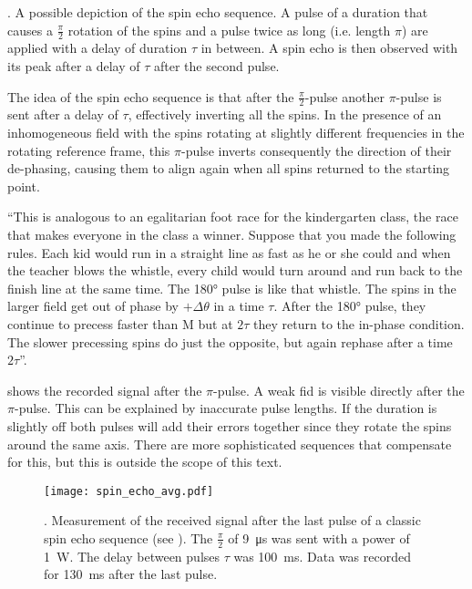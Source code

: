 \begin{marginfigure}
    \centering
    
    \caption{. A possible depiction of the spin echo sequence. A pulse of a duration that causes a \(\frac{\pi}{2}\) rotation of the spins and a pulse twice as long (i.e. length \(\pi\)) are applied with a delay of duration \(\tau\) in between. A spin echo is then observed with its peak after a delay of \(\tau\) after the second pulse.}
\end{marginfigure}

The idea of the spin echo sequence is that after the \(\frac{\pi}{2}\)-pulse another \(\pi\)-pulse is sent after a delay of \(\tau\), effectively inverting all the spins. In the presence of an inhomogeneous field with the spins rotating at slightly different frequencies in the rotating reference frame, this \(\pi\)-pulse inverts consequently the direction of their de-phasing, causing them to align again when all spins returned to the starting point.

\enquote{This is analogous to an egalitarian foot race for the kindergarten class, the race that makes everyone in the class a winner. Suppose that you made the following rules. Each kid would run in a straight line as fast as he or she could and when the teacher blows the whistle, every child would turn around and run back to the finish line at the same time. The \ang{180} pulse is like that whistle. The spins in the larger field get out of phase by \(+\Delta\theta\) in a time \(\tau\). After the \ang{180} pulse, they continue to precess faster than M but at \(2\tau\) they return to the in-phase condition. The slower precessing spins do just the opposite, but again rephase after a time \(2\tau\)}.

 shows the recorded signal after the \(\pi\)-pulse. A weak \acrshort{fid} is visible directly after the \(\pi\)-pulse. This can be explained by inaccurate pulse lengths. If the duration is slightly off both pulses will add their errors together since they rotate the spins around the same axis. There are more sophisticated sequences that compensate for this, but this is outside the scope of this text.

\begin{figure}[h!bt]
    \centering
    \texttt{[image: spin\_echo\_avg.pdf]}
    \caption{. Measurement of the received signal after the last pulse of a classic spin echo sequence (see ). The \(\frac{\pi}{2}\) of \qty{9}{\micro\second} was sent with a power of \qty{1}{\watt}. The delay between pulses \(\tau\) was \qty{100}{\milli\second}. Data was recorded for \qty{130}{\milli\second} after the last pulse.}
\end{figure}

